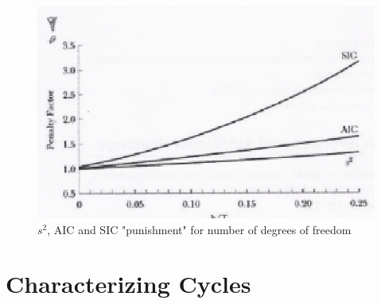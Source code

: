 \begin{figure}[htp]
\centering
\includegraphics[scale = 0.75]{selection_criterion.eps}
\caption{$s^2$, AIC and SIC "punishment" for number of degrees of freedom}
\label{selection_criterion}
\end{figure}

\section{Characterizing Cycles}

